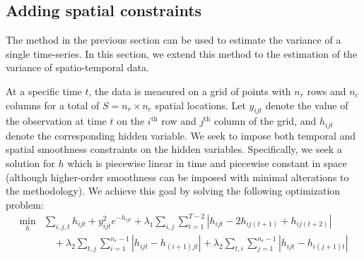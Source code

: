 \documentclass{article}
\newcommand{\attn}[1]{\textcolor{red}{TODO: #1}}
\begin{document}

\subsection{Adding spatial constraints}
\label{sec:exten}

The method in the previous section can be used to estimate the
variance of a single time-series. In this section, we extend this
method to the estimation of the variance of spatio-temporal data. 

At a specific time $t$, the data is measured on a grid of points with
$n_r$ rows and $n_c$ columns for a total of $S=n_r\times n_c$ spatial
locations. Let $y_{ijt}$ denote the value of the 
observation at time $t$ on the $i^\text{th}$ row and $j^\text{th}$
column of the grid, and $h_{ijt}$ denote the corresponding hidden
variable. We seek to impose both temporal and spatial smoothness
constraints on the hidden variables. Specifically, we seek a solution
for $h$ which is piecewise linear in time and piecewise constant in
space (although higher-order smoothness can be imposed with minimal
alterations to the methodology). We achieve this goal
by solving the following optimization problem: 
\begin{align}
\min_h &\sum_{i,j,t}h_{ijt}+y_{ijt}^2e^{-h_{ijt}}
+\lambda_1 \sum_{i,j} \sum_{t=1}^{T-2} \left|h_{ijt}-2h_{ij(t+1)}+h_{ij(t+2)}\right|\\
&\quad+\lambda_2 \sum_{t,j} \sum_{i=1}^{n_r-1} \left|h_{ijt}-h_{(i+1)jt}\right|
+\lambda_2 \sum_{t,i} \sum_{j=1}^{n_c-1} \left|h_{ijt}-h_{i(j+1)t}\right|
\label{eq:l1tf_var_st}
\end{align}
\end{document}
